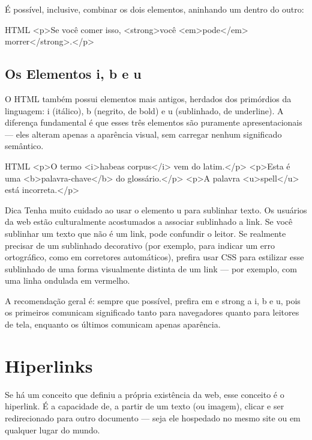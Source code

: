 É possível, inclusive, combinar os dois elementos, aninhando um dentro do outro:

\begin{codebox}{HTML}
<p>Se você comer isso, <strong>você <em>pode</em> morrer</strong>.</p>
\end{codebox}

\subsection{Os Elementos i, b e u}

O HTML também possui elementos mais antigos, herdados dos primórdios da linguagem: i (itálico), b (negrito, de bold) e u (sublinhado, de underline). A diferença fundamental é que esses três elementos são puramente apresentacionais — eles alteram apenas a aparência visual, sem carregar nenhum significado semântico.

\begin{codebox}{HTML}
 <p>O termo <i>habeas corpus</i> vem do latim.</p>
 <p>Esta é uma <b>palavra-chave</b> do glossário.</p>
 <p>A palavra <u>spell</u> está incorreta.</p>
\end{codebox}

\begin{infobox}{Dica}
Tenha muito cuidado ao usar o elemento u para sublinhar texto. Os usuários da web estão culturalmente acostumados a associar sublinhado a link. Se você sublinhar um texto que não é um link, pode confundir o leitor. Se realmente precisar de um sublinhado decorativo (por exemplo, para indicar um erro ortográfico, como em corretores automáticos), prefira usar CSS para estilizar esse sublinhado de uma forma visualmente distinta de um link — por exemplo, com uma linha ondulada em vermelho.
\end{infobox}

A recomendação geral é: sempre que possível, prefira em e strong a i, b e u, pois os primeiros comunicam significado tanto para navegadores quanto para leitores de tela, enquanto os últimos comunicam apenas aparência.

\section{Hiperlinks}

Se há um conceito que definiu a própria existência da web, esse conceito é o hiperlink. É a capacidade de, a partir de um texto (ou imagem), clicar e ser redirecionado para outro documento — seja ele hospedado no mesmo site ou em qualquer lugar do mundo.

